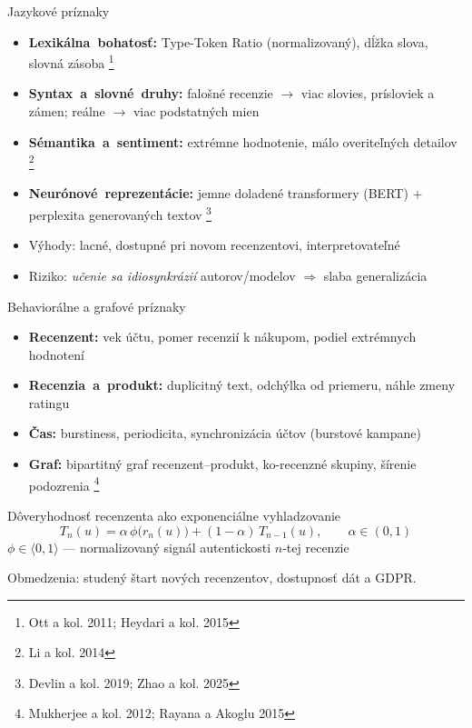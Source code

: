 \documentclass[10pt]{beamer}
\newcommand{\zdroj}[1]{\footnote{\tiny #1}}
\newcommand{\emp}[1]{\textit{\alert{#1}}}
\newcommand{\kw}[1]{\mbox{\textbf{#1}}}
\begin{document}
\begin{frame}{Jazykové príznaky}
\begin{itemize}
\item \kw{Lexikálna bohatosť:} Type-Token Ratio (normalizovaný), dĺžka slova, slovná zásoba
  \zdroj{Ott a kol. 2011; Heydari a kol. 2015}
\item \kw{Syntax a slovné druhy:} falošné recenzie $\rightarrow$ viac slovies, prísloviek a zámen; reálne $\rightarrow$ viac podstatných mien
\item \kw{Sémantika a sentiment:} extrémne hodnotenie, málo overiteľných detailov
  \zdroj{Li a kol. 2014}
\item \kw{Neurónové reprezentácie:} jemne doladené transformery (BERT) + perplexita generovaných textov
  \zdroj{Devlin a kol. 2019; Zhao a kol. 2025}
\item Výhody: lacné, dostupné pri novom recenzentovi, interpretovateľné
\item Riziko: \emp{učenie sa idiosynkrázií} autorov/modelov $\Rightarrow$ slaba generalizácia
\end{itemize}
\end{frame}

\begin{frame}{Behaviorálne a grafové príznaky}
\begin{itemize}
\item \kw{Recenzent:} vek účtu, pomer recenzií k nákupom, podiel extrémnych hodnotení
\item \kw{Recenzia a produkt:} duplicitný text, odchýlka od priemeru, náhle zmeny ratingu
\item \kw{Čas:} burstiness, periodicita, synchronizácia účtov (burstové kampane)
\item \kw{Graf:} bipartitný graf recenzent--produkt, ko-recenzné skupiny, šírenie podozrenia
  \zdroj{Mukherjee a kol. 2012; Rayana a Akoglu 2015}
\end{itemize}
\begin{block}{Dôveryhodnosť recenzenta ako exponenciálne vyhladzovanie}
\[ T_n(u) = \alpha\,\phi\bigl(r_n(u)\bigr) + (1-\alpha)\,T_{n-1}(u), \qquad \alpha \in (0,1) \]
$\phi \in \langle 0,1\rangle$ --- normalizovaný signál autentickosti $n$-tej recenzie
\end{block}
{\tiny Obmedzenia: studený štart nových recenzentov, dostupnosť dát a GDPR.}
\end{frame}
\end{document}
